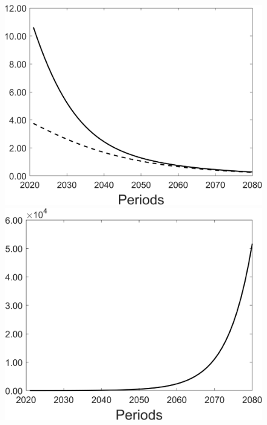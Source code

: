 \begin{figure}[h!!]
\begin{minipage}[]{0.32\textwidth}
\end{minipage}
\begin{minipage}[]{0.32\textwidth}
	\includegraphics[width=1\textwidth]{../../codding_model/Own/figures/Rep_agent/staticRam_LF_separate_xc_periods59_eppsilon4.00_zeta1.40_Ad08_Ac04_thetac0.70_thetad0.56_HetGrowth1_tauul0.181_util0_withtarget0_lgd0.png}
\end{minipage}
\begin{minipage}[]{0.32\textwidth}
	\includegraphics[width=1\textwidth]{../../codding_model/Own/figures/Rep_agent/staticRam_LF_separate_ydyc_periods59_eppsilon4.00_zeta1.40_Ad08_Ac04_thetac0.70_thetad0.56_HetGrowth1_tauul0.181_util0_withtarget0_lgd0.png}
\end{minipage}
\end{figure}

